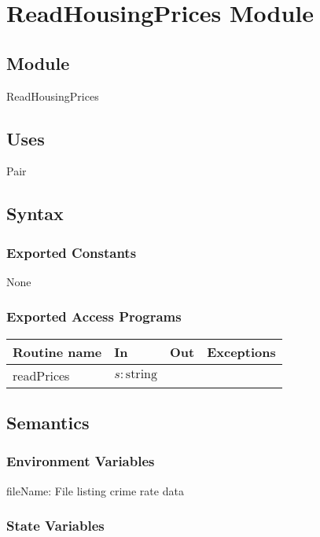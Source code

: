 \documentclass[12pt]{article}
\begin{document}
\newpage


\section* {ReadHousingPrices Module}

\subsection* {Module}

ReadHousingPrices

\subsection* {Uses}

Pair

\subsection* {Syntax}

\subsubsection* {Exported Constants}

None

\subsubsection* {Exported Access Programs}

\begin{tabular}{| l | l | l | l |}
\hline
\textbf{Routine name} & \textbf{In} & \textbf{Out} & \textbf{Exceptions}\\
\hline
readPrices & $s: \mbox{string}$ & ~ & ~\\
\hline
\end{tabular}

\subsection* {Semantics}

\subsubsection* {Environment Variables}

fileName: File listing crime rate data

\subsubsection* {State Variables}
\end{document}
